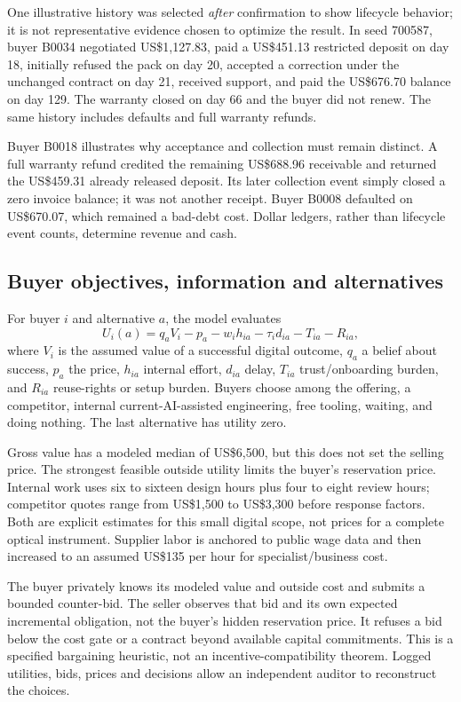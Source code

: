 One illustrative history was selected \emph{after} confirmation to show lifecycle behavior; it is not representative evidence chosen to optimize the result. In seed 700587, buyer B0034 negotiated US\$1,127.83, paid a US\$451.13 restricted deposit on day 18, initially refused the pack on day 20, accepted a correction under the unchanged contract on day 21, received support, and paid the US\$676.70 balance on day 129. The warranty closed on day 66 and the buyer did not renew. The same history includes defaults and full warranty refunds.

Buyer B0018 illustrates why acceptance and collection must remain distinct. A full warranty refund credited the remaining US\$688.96 receivable and returned the US\$459.31 already released deposit. Its later collection event simply closed a zero invoice balance; it was not another receipt. Buyer B0008 defaulted on US\$670.07, which remained a bad-debt cost. Dollar ledgers, rather than lifecycle event counts, determine revenue and cash.

\subsection{Buyer objectives, information and alternatives}
For buyer $i$ and alternative $a$, the model evaluates
\begin{equation}
U_i(a)=q_a V_i-p_a-w_i h_{ia}-\tau_i d_{ia}-T_{ia}-R_{ia},\label{eq:utility}
\end{equation}
where $V_i$ is the assumed value of a successful digital outcome, $q_a$ a belief about success, $p_a$ the price, $h_{ia}$ internal effort, $d_{ia}$ delay, $T_{ia}$ trust/onboarding burden, and $R_{ia}$ reuse-rights or setup burden. Buyers choose among the offering, a competitor, internal current-AI-assisted engineering, free tooling, waiting, and doing nothing. The last alternative has utility zero.

Gross value has a modeled median of US\$6,500, but this does not set the selling price. The strongest feasible outside utility limits the buyer's reservation price. Internal work uses six to sixteen design hours plus four to eight review hours; competitor quotes range from US\$1,500 to US\$3,300 before response factors. Both are explicit estimates for this small digital scope, not prices for a complete optical instrument. Supplier labor is anchored to public wage data and then increased to an assumed US\$135 per hour for specialist/business cost.\cite{bls,ecec}

The buyer privately knows its modeled value and outside cost and submits a bounded counter-bid. The seller observes that bid and its own expected incremental obligation, not the buyer's hidden reservation price. It refuses a bid below the cost gate or a contract beyond available capital commitments. This is a specified bargaining heuristic, not an incentive-compatibility theorem. Logged utilities, bids, prices and decisions allow an independent auditor to reconstruct the choices.

